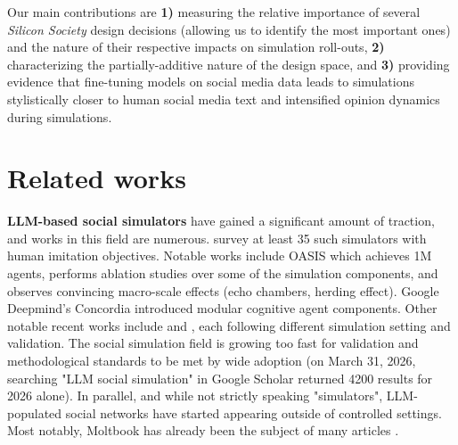 \documentclass{article} %
\begin{document}
Our main contributions are \textbf{1)} measuring the relative importance of several \textit{Silicon Society} design decisions (allowing us to identify the most important ones) and the nature of their respective impacts on simulation roll-outs, \textbf{2)} characterizing the partially-additive nature of the design space, and \textbf{3)} providing evidence that fine-tuning models on social media data leads to simulations stylistically closer to human social media text and intensified opinion dynamics during simulations.

\section{Related works}
\label{related_works}

\textbf{LLM-based social simulators} have gained a significant amount of traction, and works in this field are %
numerous. %
\cite{larooij2025largelanguagemodelssolve} survey at least 35 such simulators with human imitation objectives. Notable works include OASIS \citep{yang2025oasisopenagentsocial} which achieves 1M agents, performs ablation studies over some of the simulation components, and observes convincing macro-scale effects (echo chambers, herding effect). Google Deepmind's Concordia \citep{vezhnevets2023generative} introduced modular cognitive agent components. Other notable recent works include \cite{zheng2026rolesimllm,lu2026real} and \cite{yuzhe2026twinmarket}, each following different simulation setting and validation. 
 The social simulation field is growing too fast %
 for validation and methodological standards to be met by wide adoption (on March 31, 2026, searching "LLM social simulation" in Google Scholar returned 4200 results for 2026 alone). 
In parallel, and while not strictly speaking "simulators", LLM-populated social networks have started appearing outside of controlled settings. Most notably, Moltbook has already been the subject of many articles  \citep{sodano2026emergencefragilityllmbasedsocial,jiang2026humans,holtz2026anatomy}.
\end{document}
